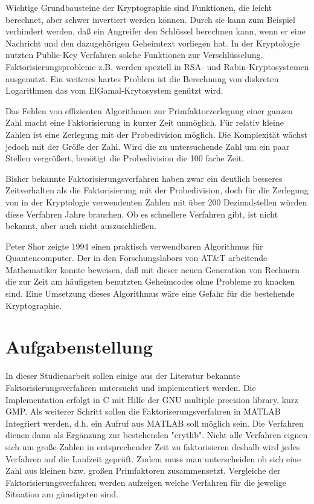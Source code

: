 \documentclass[10pt, bigheadings]{scrartcl}
\begin{document}
Wichtige Grundbausteine der Kryptographie sind Funktionen, die
leicht berechnet, aber schwer invertiert werden können. Durch sie
kann zum Beispiel verhindert werden, daß ein Angreifer den Schlüssel
berechnen kann, wenn er eine Nachricht und den dazugehörigen Geheimtext
vorliegen hat. In der Kryptologie nutzten Public-Key Verfahren solche
Funktionen zur Verschlüsselung. Faktorisierungsprobleme z.B. werden
speziell in RSA- und Rabin-Kryptosystemen ausgenutzt. Ein weiteres
hartes Problem ist die Berechnung von diskreten Logarithmen
das vom ElGamal-Krytosystem genützt wird.

Das Fehlen von effizienten Algorithmen zur Primfaktorzerlegung einer
ganzen Zahl macht eine Faktorisierung in kurzer Zeit unmöglich.
Für relativ kleine Zahlen ist eine Zerlegung mit der Probedivision
möglich. Die Komplexität wächst jedoch mit der Größe der Zahl. Wird
die zu untersuchende Zahl um ein paar Stellen vergrößert, benötigt
die Probedivision die 100 fache Zeit.

Bisher bekannte Faktorisierungsverfahren
haben zwar ein deutlich besseres Zeitverhalten als die Faktorisierung
mit der Probedivision, doch für die Zerlegung von in
der Kryptologie verwendenten Zahlen mit über 200 Dezimalstellen würden
diese Verfahren Jahre brauchen. Ob es schnellere Verfahren gibt,
ist nicht bekannt, aber auch nicht auszuschließen.

Peter Shor zeigte 1994 einen praktisch verwendbaren Algorithmus für
Quantencomputer. Der in den Forschungslabors von AT\&T arbeitende
Mathematiker konnte beweisen, daß mit dieser neuen Generation von
Rechnern die zur Zeit am häufigsten benutzten Geheimcodes ohne Probleme
zu knacken sind. Eine Umsetzung dieses Algorithmus wäre eine Gefahr für
die bestehende Kryptographie.

\section{Aufgabenstellung}
In dieser Studienarbeit sollen einige aus der Literatur bekannte
Faktorisierungsverfahren untersucht und implementiert werden. Die
Implementation erfolgt in C mit Hilfe der GNU multiple precision
library, kurz GMP. Als weiterer Schritt sollen die
Faktoriserungsverfahren in MATLAB Integriert werden, d.h. ein Aufruf
aus MATLAB soll möglich sein. Die Verfahren dienen dann als Ergänzung
zur bestehenden "crytlib".
Nicht alle Verfahren eignen sich um große Zahlen in entsprechender Zeit
zu faktorisieren deshalb wird jedes Verfahren auf die Laufzeit geprüft.
Zudem muss man unterscheiden ob sich eine Zahl aus kleinen bzw. großen
Primfaktoren zusammensetzt. Vergleiche der Faktorisierungsverfahren
werden aufzeigen welche Verfahren für die jewelige Situation am
günstigsten sind.
\end{document}
